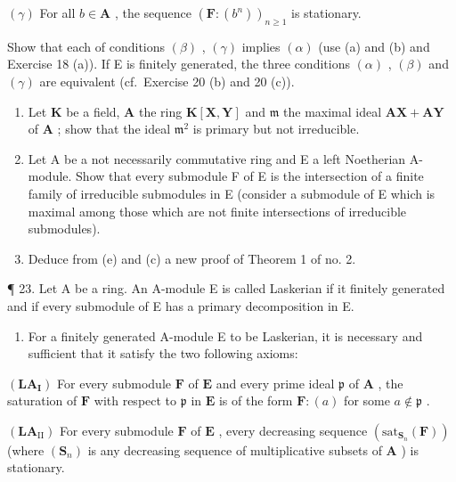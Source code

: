 \((\gamma)\) For all \(b \in \mathbf{A}\) , the sequence \((\mathbf{F}:(b^n))_{n \geqslant 1}\) is stationary.

Show that each of conditions \((\beta)\) , \((\gamma)\) implies \((\alpha)\) (use (a) and (b) and Exercise 18 (a)). If E is finitely generated, the three conditions \((\alpha)\) , \((\beta)\) and \((\gamma)\) are equivalent (cf.~Exercise 20 (b) and 20 (c)).

\begin{enumerate}
\def\labelenumi{(\alph{enumi})}
\setcounter{enumi}{3}
\item
  Let \(\mathbf{K}\) be a field, \(\mathbf{A}\) the ring \(\mathbf{K}[\mathbf{X},\mathbf{Y}]\) and \(\mathfrak{m}\) the maximal ideal \(\mathbf{AX} + \mathbf{AY}\) of \(\mathbf{A}\) ; show that the ideal \(\mathfrak{m}^2\) is primary but not irreducible.
\item
  Let A be a not necessarily commutative ring and E a left Noetherian A-module. Show that every submodule F of E is the intersection of a finite family of irreducible submodules in E (consider a submodule of E which is maximal among those which are not finite intersections of irreducible submodules).
\item
  Deduce from (e) and (c) a new proof of Theorem 1 of no. 2.
\end{enumerate}

¶ 23. Let A be a ring. An A-module E is called Laskerian if it finitely generated and if every submodule of E has a primary decomposition in E.

\begin{enumerate}
\def\labelenumi{(\alph{enumi})}
\tightlist
\item
  For a finitely generated A-module E to be Laskerian, it is necessary and sufficient that it satisfy the two following axioms:
\end{enumerate}

\((\mathbf{LA}_{\mathbf{I}})\) For every submodule \(\mathbf{F}\) of \(\mathbf{E}\) and every prime ideal \(\mathfrak{p}\) of \(\mathbf{A}\) , the saturation of \(\mathbf{F}\) with respect to \(\mathfrak{p}\) in \(\mathbf{E}\) is of the form \(\mathbf{F}:(a)\) for some \(a\notin\mathfrak{p}\) .

\((\mathbf{L}\mathbf{A}_{\mathrm{II}})\) For every submodule \(\mathbf{F}\) of \(\mathbf{E}\) , every decreasing sequence \((\mathrm{sat}_{\mathbf{S}_{n}}(\mathbf{F}))\) (where \((\mathbf{S}_{n})\) is any decreasing sequence of multiplicative subsets of \(\mathbf{A}\) ) is stationary.

